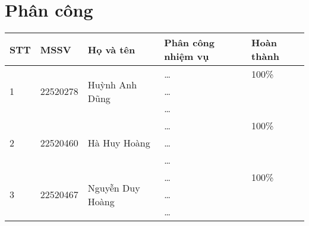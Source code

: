 \chapter*{Phân công}
\begin{table}[H]
	\begin{tabularx}{\linewidth}{lllXl}
		\toprule
		STT                   & MSSV                         & Họ và tên                            & Phân công nhiệm vụ & Hoàn thành \\
		\midrule\midrule
		\multirow[t]{3}{*}{1} & \multirow[t]{3}{*}{22520278} & \multirow[t]{3}{*}{Huỳnh Anh Dũng}   & \dots              & 100\%      \\
		                      &                              &                                      & \dots              &            \\
		                      &                              &                                      & \dots              &            \\
		\multirow[t]{3}{*}{2} & \multirow[t]{3}{*}{22520460} & \multirow[t]{3}{*}{Hà Huy Hoàng}     & \dots              & 100\%      \\
		                      &                              &                                      & \dots              &            \\
		                      &                              &                                      & \dots              &            \\
		\multirow[t]{3}{*}{3} & \multirow[t]{3}{*}{22520467} & \multirow[t]{3}{*}{Nguyễn Duy Hoàng} & \dots              & 100\%      \\
		                      &                              &                                      & \dots              &            \\
		                      &                              &                                      & \dots              &            \\
		\bottomrule
	\end{tabularx}
\end{table}